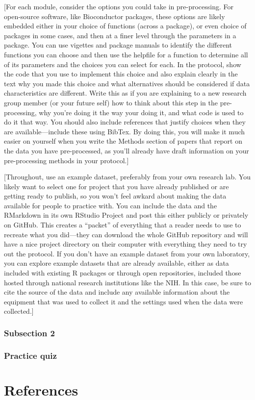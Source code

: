 \documentclass[]{tufte-book}
\begin{document}
{[}For each module, consider the options you could take in pre-processing. For
open-source software, like Bioconductor packages, these options are likely
embedded either in your choice of functions (across a package), or even choice
of packages in some cases, and then at a finer level through the parameters in a
package. You can use vigettes and package manuals to identify the different
functions you can choose and then use the helpfile for a function to determine
all of its parameters and the choices you can select for each. In the protocol,
show the code that you use to implement this choice and also explain clearly in
the text why you made this choice and what alternatives should be considered if
data characteristics are different. Write this as if you are explaining to a new
research group member (or your future self) how to think about this step in the
pre-processing, why you're doing it the way your doing it, and what code is used
to do it that way. You should also include references that justify choices when
they are available---include these using BibTex. By doing this, you will make it
much easier on yourself when you write the Methods section of papers that report
on the data you have pre-processed, as you'll already have draft information on
your pre-processing methods in your protocol.{]}

{[}Throughout, use an example dataset, preferably from your own research lab. You
likely want to select one for project that you have already published or are
getting ready to publish, so you won't feel awkard about making the data
available for people to practice with. You can include the data and the
RMarkdown in its own RStudio Project and post this either publicly or privately
on GitHub. This creates a ``packet'' of everything that a reader needs to use to
recreate what you did---they can download the whole GitHub repository and will
have a nice project directory on their computer with everything they need to try
out the protocol. If you don't have an example dataset from your own laboratory,
you can explore example datasets that are already available, either as data
included with existing R packages or through open repositories, included those
hosted through national research institutions like the NIH. In this case, be
sure to cite the source of the data and include any available information about
the equipment that was used to collect it and the settings used when the data
were collected.{]}

\hypertarget{subsection-2}{%
\subsection{Subsection 2}\label{subsection-2}}

\hypertarget{practice-quiz}{%
\subsection{Practice quiz}\label{practice-quiz}}

\hypertarget{references}{%
\chapter{References}\label{references}}


\end{document}
